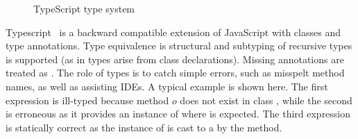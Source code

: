 \documentclass[acmlarge, anonymous, authordraft]{acmart}
\begin{document}
\begin{figure}
\hrulefill
\begin{mathpar}









\end{mathpar}

\hrulefill
\caption{TypeScript type system}\label{f:typescriptts}
\end{figure}


Typescript~\cite{BAT14} is a backward compatible extension of JavaScript
with classes and type annotations. Type equivalence is structural and
subtyping of recursive types is supported (as in \kafka types arise from class
declarations). Missing annotations are treated as \any. The role of types is
to catch simple errors, such as misspelt method names, as well as assisting
IDEs.  A typical example is shown here. The first expression is ill-typed
because method \(o\) does not exist in class \C, while the second is erroneous as it
provides an instance of \C where \D is expected. The third
expression is statically correct as the instance of \C is cast to a
\D by the \n method.
%
\end{document}
